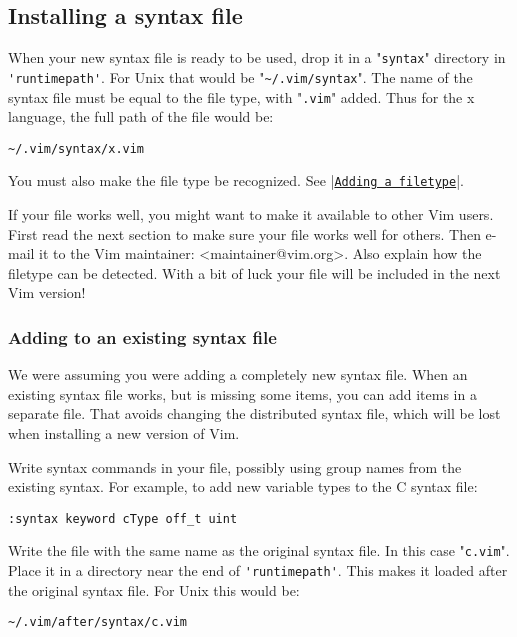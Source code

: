 \subsection{Installing a syntax file}
When your new syntax file is ready to be used, drop it in a "\verb!syntax!" directory in \verb!'runtimepath'!.
For Unix that would be "\verb!~/.vim/syntax!".
The name of the syntax file must be equal to the file type, with "\verb!.vim!" added.
Thus for the x language, the full path of the file would be:

\begin{Verbatim}[samepage=true]
    ~/.vim/syntax/x.vim 
\end{Verbatim}

You must also make the file type be recognized.
See |\hyperref[Adding a filetype]{\texttt{Adding a filetype}}|.

If your file works well, you might want to make it available to other Vim users.
First read the next section to make sure your file works well for others. Then e-mail it to the Vim maintainer: <maintainer@vim.org>. Also explain how the filetype can be detected.
With a bit of luck your file will be included in the next Vim version!

\subsubsection{Adding to an existing syntax file}
We were assuming you were adding a completely new syntax file.
When an existing syntax file works, but is missing some items, you can add items in a separate file.
That avoids changing the distributed syntax file, which will be lost when installing a new version of Vim.

Write syntax commands in your file, possibly using group names from the existing syntax.
For example, to add new variable types to the C syntax file:

\begin{Verbatim}[samepage=true]
 :syntax keyword cType off_t uint
\end{Verbatim}

Write the file with the same name as the original syntax file.
In this case "\verb!c.vim!".
Place it in a directory near the end of \verb!'runtimepath'!.
This makes it loaded after the original syntax file.
For Unix this would be:

\begin{Verbatim}[samepage=true]
    ~/.vim/after/syntax/c.vim 
\end{Verbatim}
